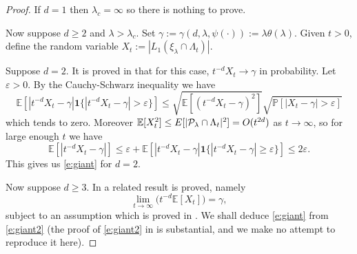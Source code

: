 \documentclass[a4paper,12pt]{scrartcl}
\newcommand{\E}{\mathbb{E}}
\theoremstyle{definition}
\theoremstyle{remark}
\begin{document}
  \begin{proof}
    If $d=1$ then $\lambda_c = \infty$ so there is nothing to prove.

    Now suppose $d \geq 2$ and $\lambda > \lambda_c$.
    Set $\gamma:= \gamma(d,\lambda,\psi(\cdot)) := \lambda \theta(\lambda)$.
    Given $t >0$, define the random variable $X_t :=
    |L_1(\xi_\lambda \cap \Lambda_t)|$.

    Suppose $d=2$. It is proved in \cite{pen_giant_comp_srgg}
    that for this case, $t^{-d}X_t \to \gamma $ in probability.
    Let $\varepsilon > 0$.
    By the Cauchy-Schwarz inequality we have
    $$
    \mathbb  E[ |t^{-d} X_t - \gamma |
    \mathbf{1} \{ |t^{-d} X_t - \gamma | > \varepsilon \}]
    \leq  \sqrt{\mathbb E[ (t^{-d} X_t - \gamma)^2]}
    \sqrt{\mathbb P[|X_t -\gamma| > \varepsilon] }
    $$
    which tends to zero.
    Moreover $\mathbb E[X_t^2]
    \leq \mathbb \E[ | \mathcal P_\lambda \cap \Lambda_t|^2
    ] = O(t^{2d})$ as $t \to \infty$, so
    for large enough $t$ we have
    $$
    \mathbb E[ |t^{-d} X_t - \gamma|] \leq \varepsilon
    +
    \mathbb E[ |t^{-d} X_t - \gamma| \mathbf{1}
    \{ |t^{-d} X_t- \gamma| \geq \varepsilon \}] \leq 2 \varepsilon.
    $$
    This gives us \eqref{e:giant} for $d=2$.

    Now suppose $d \geq 3$.
    In \cite{kupper2025} a related  result is proved, namely
    \begin{equation}
      \lim_{t \to \infty} \big(
        t^{-d} \mathbb E[ X_t %
        ]
      \big) = \gamma, %
      \label{e:giant2}
    \end{equation}
    subject to an assumption which is proved in
    \cite[Corollary 1.4]{penrose2025supercritical}.
    We shall %
    deduce \eqref{e:giant} from
    \eqref{e:giant2} (the proof of \eqref{e:giant2} in \cite{kupper2025}
    is substantial, and we make no attempt to reproduce it here).


\end{proof}
\end{document}
